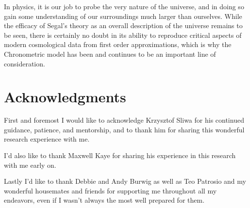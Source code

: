 \documentclass[a4paper]{article}
\begin{document}
    In physics, it is our job to probe the very nature of the universe, and in
    doing so gain some understanding of our surroundings much larger than
    ourselves. While the efficacy of Segal's theory as an overall description
    of the universe remains to be seen, there is certainly no doubt in its
    ability to reproduce critical aspects of modern cosmological data from
    first order approximations, which is why the Chronometric model has been and
    continues to be an important line of consideration.
    \section{Acknowledgments}
    First and foremost I would like to acknowledge Krzysztof Sliwa for his
    continued guidance, patience, and mentorship, and to thank him for sharing
    this wonderful research experience with me.

    I'd also like to thank Maxwell Kaye for sharing his experience in this
    research with me early on.

    Lastly I'd like to thank Debbie and Andy Burwig as well as Teo Patrosio and
    my wonderful housemates and friends for supporting me throughout all my
    endeavors, even if I wasn't always the most well prepared for them.
    \newpage

    \nocite{*}
\end{document}

